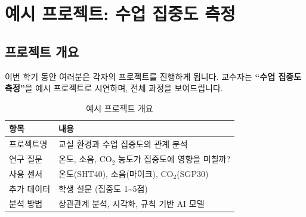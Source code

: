 \documentclass[11pt, a4paper]{article}
\begin{document}
\section{예시 프로젝트: 수업 집중도 측정}

\subsection{프로젝트 개요}

이번 학기 동안 여러분은 각자의 프로젝트를 진행하게 됩니다. 교수자는 \textbf{``수업 집중도 측정''}을 예시 프로젝트로 시연하며, 전체 과정을 보여드립니다.

\begin{table}[H]
\centering
\begin{tabularx}{\textwidth}{l X}
\toprule
\textbf{항목} & \textbf{내용} \\
\midrule
프로젝트명 & 교실 환경과 수업 집중도의 관계 분석 \\
연구 질문 & 온도, 소음, CO$_2$ 농도가 집중도에 영향을 미칠까? \\
사용 센서 & 온도(SHT40), 소음(마이크), CO$_2$(SGP30) \\
추가 데이터 & 학생 설문 (집중도 1\textasciitilde5점) \\
분석 방법 & 상관관계 분석, 시각화, 규칙 기반 AI 모델 \\
\bottomrule
\end{tabularx}
\caption{예시 프로젝트 개요}
\end{table}
\end{document}
